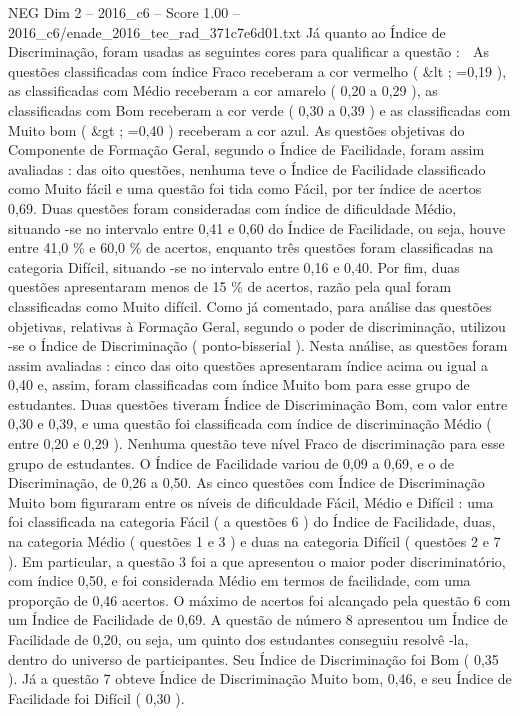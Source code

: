 \begin{textsample}{NEG Dim 2 – 2016\_c6 – Score 1.00 – 2016\_c6/enade\_2016\_tec\_rad\_371c7e6d01.txt}
Já quanto ao Índice de Discriminação, foram usadas as seguintes cores para qualificar a questão :  As questões classificadas com índice Fraco receberam a cor vermelho ( \&lt ; =0,19 ), as classificadas com Médio receberam a cor amarelo ( 0,20 a 0,29 ), as classificadas com Bom receberam a cor verde ( 0,30 a 0,39 ) e as classificadas com Muito bom ( \&gt ; =0,40 ) receberam a cor azul.
As questões objetivas do Componente de Formação Geral, segundo o Índice de Facilidade, foram assim avaliadas : das oito questões, nenhuma teve o Índice de Facilidade classificado como Muito fácil e uma questão foi tida como Fácil, por ter índice de acertos 0,69.
Duas questões foram consideradas com índice de dificuldade Médio, situando -se no intervalo entre 0,41 e 0,60 do Índice de Facilidade, ou seja, houve entre 41,0 \% e 60,0 \% de acertos, enquanto três questões foram classificadas na categoria Difícil, situando -se no intervalo entre 0,16 e 0,40.
Por fim, duas questões apresentaram menos de 15 \% de acertos, razão pela qual foram classificadas como Muito difícil.
Como já comentado, para análise das questões objetivas, relativas à Formação Geral, segundo o poder de discriminação, utilizou -se o Índice de Discriminação ( ponto-bisserial ).
Nesta análise, as questões foram assim avaliadas : cinco das oito questões apresentaram índice acima ou igual a 0,40 e, assim, foram classificadas com índice Muito bom para esse grupo de estudantes.
Duas questões tiveram Índice de Discriminação Bom, com valor entre 0,30 e 0,39, e uma questão foi classificada com índice de discriminação Médio ( entre 0,20 e 0,29 ).
Nenhuma questão teve nível Fraco de discriminação para esse grupo de estudantes.
O Índice de Facilidade variou de 0,09 a 0,69, e o de Discriminação, de 0,26 a 0,50.
As cinco questões com Índice de Discriminação Muito bom figuraram entre os níveis de dificuldade Fácil, Médio e Difícil : uma foi classificada na categoria Fácil ( a questões 6 ) do Índice de Facilidade, duas, na categoria Médio ( questões 1 e 3 ) e duas na categoria Difícil ( questões 2 e 7 ).
Em particular, a questão 3 foi a que apresentou o maior poder discriminatório, com índice 0,50, e foi considerada Médio em termos de facilidade, com uma proporção de 0,46 acertos.
O máximo de acertos foi alcançado pela questão 6 com um Índice de Facilidade de 0,69.
A questão de número 8 apresentou um Índice de Facilidade de 0,20, ou seja, um quinto dos estudantes conseguiu resolvê -la, dentro do universo de participantes.
Seu Índice de Discriminação foi Bom ( 0,35 ).
Já a questão 7 obteve Índice de Discriminação Muito bom, 0,46, e seu Índice de Facilidade foi Difícil ( 0,30 ).

\end{textsample}
